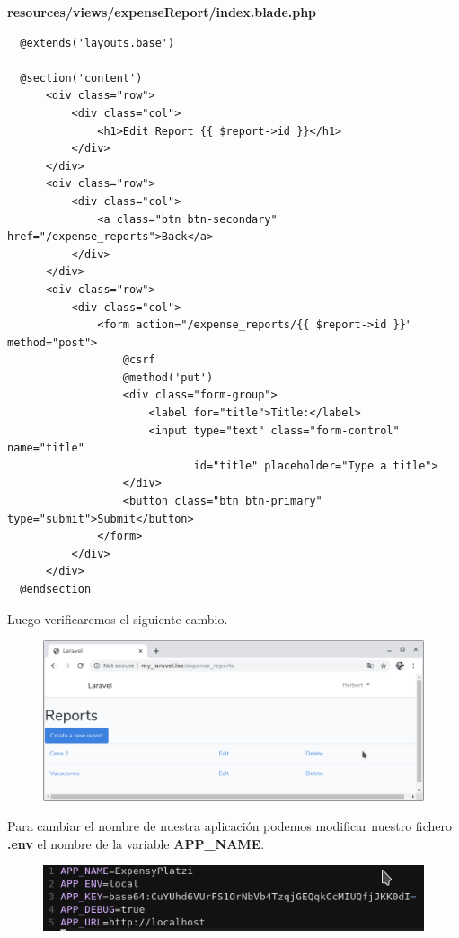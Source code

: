 \documentclass{article}
\begin{document}
\textbf{resources/views/expenseReport/index.blade.php}
\begin{verbatim}
  @extends('layouts.base')

  @section('content')
      <div class="row">
          <div class="col">
              <h1>Edit Report {{ $report->id }}</h1>
          </div>
      </div>
      <div class="row">
          <div class="col">
              <a class="btn btn-secondary" href="/expense_reports">Back</a>
          </div>
      </div>
      <div class="row">
          <div class="col">
              <form action="/expense_reports/{{ $report->id }}" method="post">
                  @csrf
                  @method('put')
                  <div class="form-group">
                      <label for="title">Title:</label>
                      <input type="text" class="form-control" name="title"
                             id="title" placeholder="Type a title">
                  </div>
                  <button class="btn btn-primary" type="submit">Submit</button>
              </form>
          </div>
      </div>
  @endsection
\end{verbatim}

Luego verificaremos el siguiente cambio.

\begin{figure}[h!]
  \centering
  \includegraphics[scale=0.5]{./Pictures/136_reports_extends.png}
\end{figure}

Para cambiar el nombre de nuestra aplicación podemos modificar nuestro fichero
\textbf{.env} el nombre de la variable \textbf{APP\_NAME}.\\

\begin{figure}[h!]
  \centering
  \includegraphics[scale=0.75]{./Pictures/138_env_file.png}
\end{figure}
\end{document}
